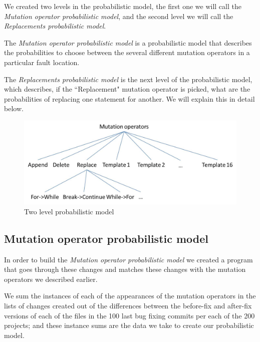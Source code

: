 \documentclass[conference]{IEEEtran}
\begin{document}
We created two levels in the probabilistic model, the first one we will call the 
\textit{Mutation operator probabilistic model}, and the second level we will 
call the \textit{Replacements probabilistic model}.

The \textit{Mutation operator probabilistic model} is a probabilistic model that 
describes the probabilities to choose between the several different mutation 
operators in a particular fault location.

The \textit{Replacements probabilistic model} is the next level of the 
probabilistic model, which describes, if the ``Replacement" mutation operator is 
picked, what are the probabilities of replacing one statement for another. We 
will explain this in detail below.


\begin{figure}[!h]
  \centering
    \includegraphics[scale=0.4]{Picture2}
  \caption{Two level probabilistic model}
  \label{fig:probModel}
\end{figure}

\subsection{Mutation operator probabilistic model}
In order to build the \textit{Mutation operator probabilistic model} we created 
a program that goes through these 
changes and matches these changes with the mutation operators we described 
earlier.

We sum the instances of each of the appearances of the mutation operators in the 
lists of changes created out of the differences between the before-fix and 
after-fix versions of each of the files in the 100 last bug fixing commits per 
each of the 200 projects; and these instance sums are the data we take to create 
our probabilistic model.
  
\end{document}

